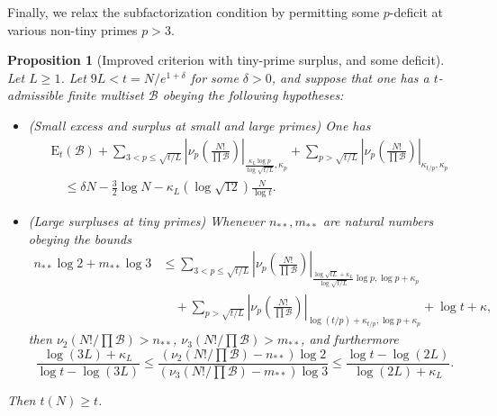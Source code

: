 \documentclass[12pt,a4paper,reqno]{amsart}
\numberwithin{equation}{section}
\theoremstyle{plain}
\newtheorem{proposition}[theorem]{Proposition}
\theoremstyle{definition}
\newcommand\tuple{{\mathcal B}}
\newcommand\excess{{\mathrm{E}}}
\begin{document}
Finally, we relax the subfactorization condition by permitting some $p$-deficit at various non-tiny primes $p>3$.

\begin{proposition}[Improved criterion with tiny-prime surplus, and some deficit]\label{balance-23''}  Let $L \geq 1$.  Let $9L < t = N/e^{1+\delta}$ for some $\delta>0$, and suppose that one has a $t$-admissible finite multiset $\tuple$ obeying the following hypotheses:
  \begin{itemize}
  \item[(i)] (Small excess and surplus at small and large primes) One has
\begin{equation}\label{new-balance-5}
    \begin{split}
&      \excess_t(\tuple) + \sum_{3 < p \leq \sqrt{t/L}}
   \left|\nu_p\left(\frac{N!}{\prod \tuple}\right)\right|_{\frac{\kappa_L \log p}{\log \sqrt{t/L}},\kappa_p} + 
   \sum_{p>\sqrt{t/L}} \left|\nu_p\left(\frac{N!}{\prod \tuple}\right)\right|_{\kappa_{t/p},\kappa_p}\\
&\quad    \leq \delta N - \frac{3}{2} \log N - \kappa_L (\log \sqrt{12}) \frac{N}{\log t}.
    \end{split}
  \end{equation}
  \item[(ii)] (Large surpluses at tiny primes) 
  Whenever $n_{**}, m_{**}$ are natural numbers obeying the bounds
  \begin{align*}
   n_{**} \log 2 + m_{**} \log 3 &\leq 
    \sum_{3 < p \leq \sqrt{t/L}}
    \left|\nu_p\left(\frac{N!}{\prod \tuple}\right)\right|_{\frac{\log \sqrt{tL} + \kappa_L}{\log\sqrt{t/L}} \log p,\log p+\kappa_p}\\
  &\quad   + 
    \sum_{p > \sqrt{t/L}} \left|\nu_p\left(\frac{N!}{\prod \tuple}\right)\right|_{\log(t/p) + \kappa_{t/p},\log p + \kappa_p}   
    + \log t + \kappa,
  \end{align*}
    then $\nu_2(N!/\prod \tuple) > n_{**}$, $\nu_3(N!/\prod \tuple) > m_{**}$, and furthermore
  $$
  \frac{\log(3L)+\kappa_L}{\log t - \log(3L)} \leq \frac{(\nu_2(N!/\prod \tuple)-n_{**}) \log 2}{(\nu_3(N!/\prod \tuple)-m_{**}) \log 3} \leq \frac{\log t - \log(2L)}{\log(2L)+\kappa_L}.
  $$
  \end{itemize}
     Then $t(N) \geq t$.
\end{proposition}
\end{document}
